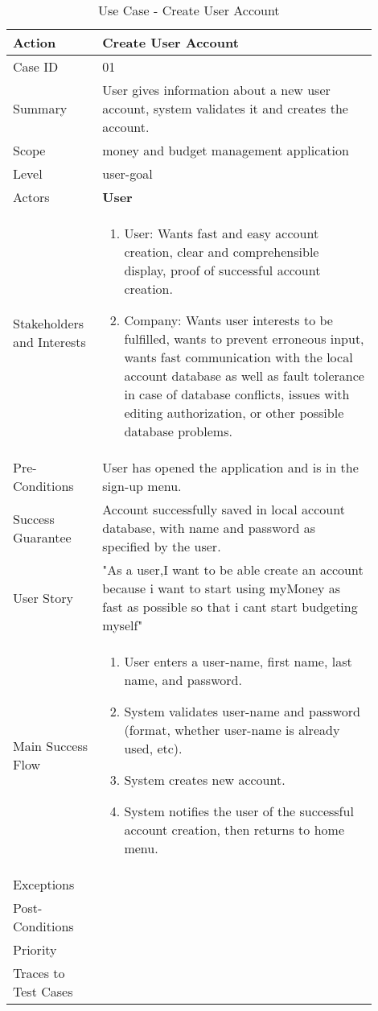 \documentclass[11pt]{article}
\newcounter{use case ID}
\newcommand\tabularhead[1]{
\begin{table}[ht]
    \addtocounter{use case ID}{1}
    \caption{Use Case \arabic{use case ID} - #1}
    \vspace{0.2cm}
    \begin{tabular}{|p{0.2\linewidth}|p{0.70\linewidth}|}
    \hline
        \textbf{Action} & \textbf{#1} \\
        \hline}
\newcommand\addrow[2]{#1 & #2\\ \hline}
\newcommand\addmulrow[2]{ \begin{minipage}[t][][t]{2.5cm}#1\end{minipage}
        &\begin{minipage}[t][][t]{11cm}
        \begin{enumerate}[itemsep=-1ex] #2   \end{enumerate}
    \end{minipage}\vfill\\ \hline}
\newenvironment{usecase}{\tabularhead}
{\hline\end{tabular}\end{table}}
\begin{document}
\begin{usecase}{Create User Account}
    \addrow{Case ID}{01}
    \addrow{Summary}{User gives information about a new user account, system validates it and creates the account.}
    \addrow{Scope}{money and budget management application}
    \addrow{Level}{user-goal}
    \addrow{Actors}{\textbf{User}}
    \addmulrow{Stakeholders and Interests}{
        \item User: Wants fast and easy account creation, clear and comprehensible display, proof of successful account creation.
        \item Company: Wants user interests to be fulfilled, wants to prevent erroneous input, wants fast communication with the local account database as well as fault tolerance in case of database conflicts, issues with editing authorization, or other possible database problems.}
    \addrow{Pre-Conditions}{User has opened the application and is in the sign-up menu.}
    \addrow{Success Guarantee}{Account successfully saved in local account database, with name and password as specified by the user.}
    \addrow{User Story} {"As a user,I want to be able create an account because i want to start using myMoney as fast as possible so that i cant start budgeting myself"}
    \addmulrow{Main Success Flow}{
        \item User enters a user-name, first name, last name, and password.
        \item System validates user-name and password (format, whether user-name is already used, etc).
        \item System creates new account.
        \item System notifies the user of the successful account creation, then returns to home menu.}
    \addrow{Exceptions}{}
    \addrow{Post-Conditions}{}
    \addrow{Priority}{}
    \addrow{Traces to Test Cases}{}
\end{usecase}
\end{document}
